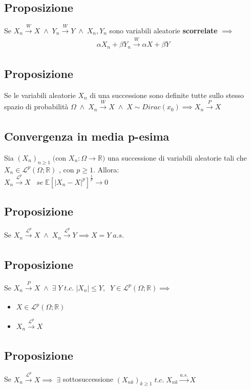 \documentclass{article}
\begin{document}
\subsection*{Proposizione}
Se $X_{n} \xrightarrow[]{W}X \; \wedge \; Y_{n} \xrightarrow[]{W}Y \; \wedge \; X_{n}, Y_{n}$ sono variabili aleatorie \textbf{scorrelate} $\implies$
\[ \alpha X_{n}+\beta  Y_{n} \xrightarrow[]{W} \alpha X+\beta Y \]

\subsection*{Proposizione}
Se le variabili aleatorie $X_{n}$ di una successione sono definite tutte sullo stesso spazio di probabilità $\Omega \; \wedge \; X_{n} \xrightarrow[]{W}X \; \wedge \; X \sim Dirac(x_{0}) \implies X_{n} \xrightarrow[]{P}X$

\subsection*{Convergenza in media p-esima}
Sia $(X_{n})_{n \geq 1} \; ($con $ X_{n}: \Omega \to \mathbb{R})$ una successione di variabili aleatorie tali che $X_{n} \in \mathcal{L}^{p}(\Omega; \mathbb{R})$ , con $p \geq 1$. Allora:\\
$X_{n} \xrightarrow[]{\mathcal{L}^{p}}X \; \; \; se \; \mathbb{E}[|X_{n}-X|^{p}]^{\frac{1}{p}} \to 0$

\subsection*{Proposizione}
Se $X_{n} \xrightarrow[]{\mathcal{L}^{p}}X \; \wedge \; X_{n} \xrightarrow[]{\mathcal{L}^{p}}Y \implies X=Y \; a.s.$

\subsection*{Proposizione}
Se $X_{n} \xrightarrow[]{P}X \; \wedge \; \exists \; Y \; t.c. \; |X_{n}| \leq Y, \; \; Y \in \mathcal{L}^{p}(\Omega; \mathbb{R}) \implies$
\begin{itemize}
\item $X\in \mathcal{L}^{p}(\Omega; \mathbb{R})$
\item $X_{n} \xrightarrow[]{\mathcal{L}^{p}}X$
\end{itemize}

\subsection*{Proposizione}
Se $X_{n} \xrightarrow[]{\mathcal{L}^{p}}X \implies \; \exists$ sottosuccessione $(X_{nk})_{k\geq 1} \; t.c. \; X_{nk} \xrightarrow[]{a.s.}X$
\end{document}
